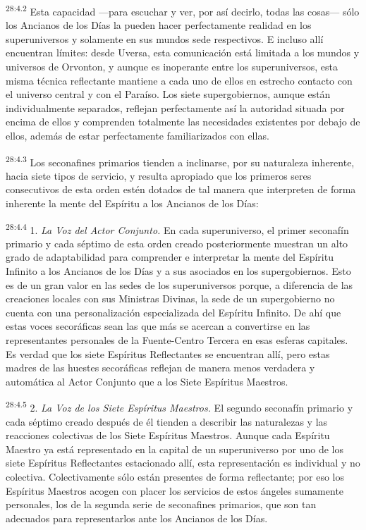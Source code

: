\par
\textsuperscript{28:4.2} Esta capacidad ---para escuchar y ver, por así decirlo, todas las cosas--- sólo los Ancianos de los Días la pueden hacer perfectamente realidad en los superuniversos y solamente en sus mundos sede respectivos. E incluso allí encuentran límites: desde Uversa, esta comunicación está limitada a los mundos y universos de Orvonton, y aunque es inoperante entre los superuniversos, esta misma técnica reflectante mantiene a cada uno de ellos en estrecho contacto con el universo central y con el Paraíso. Los siete supergobiernos, aunque están individualmente separados, reflejan perfectamente así la autoridad situada por encima de ellos y comprenden totalmente las necesidades existentes por debajo de ellos, además de estar perfectamente familiarizados con ellas.

\par
\textsuperscript{28:4.3} Los seconafines primarios tienden a inclinarse, por su naturaleza inherente, hacia siete tipos de servicio, y resulta apropiado que los primeros seres consecutivos de esta orden estén dotados de tal manera que interpreten de forma inherente la mente del Espíritu a los Ancianos de los Días:

\par
\textsuperscript{28:4.4} 1. \textit{La Voz del Actor Conjunto.} En cada superuniverso, el primer seconafín primario y cada séptimo de esta orden creado posteriormente muestran un alto grado de adaptabilidad para comprender e interpretar la mente del Espíritu Infinito a los Ancianos de los Días y a sus asociados en los supergobiernos. Esto es de un gran valor en las sedes de los superuniversos porque, a diferencia de las creaciones locales con sus Ministras Divinas, la sede de un supergobierno no cuenta con una personalización especializada del Espíritu Infinito. De ahí que estas voces secoráficas sean las que más se acercan a convertirse en las representantes personales de la Fuente-Centro Tercera en esas esferas capitales. Es verdad que los siete Espíritus Reflectantes se encuentran allí, pero estas madres de las huestes secoráficas reflejan de manera menos verdadera y automática al Actor Conjunto que a los Siete Espíritus Maestros.

\par
\textsuperscript{28:4.5} 2. \textit{La Voz de los Siete Espíritus Maestros.} El segundo seconafín primario y cada séptimo creado después de él tienden a describir las naturalezas y las reacciones colectivas de los Siete Espíritus Maestros. Aunque cada Espíritu Maestro ya está representado en la capital de un superuniverso por uno de los siete Espíritus Reflectantes estacionado allí, esta representación es individual y no colectiva. Colectivamente sólo están presentes de forma reflectante; por eso los Espíritus Maestros acogen con placer los servicios de estos ángeles sumamente personales, los de la segunda serie de seconafines primarios, que son tan adecuados para representarlos ante los Ancianos de los Días.

